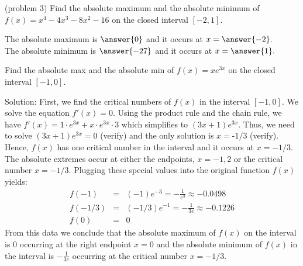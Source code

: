 \documentclass[handout]{ximera}
\begin{document}
\begin{problem}(problem 3)
Find the absolute maximum and the absolute minimum of $f(x) = x^4 - 4x^3 - 8x^2 - 16$  
on the closed interval $[-2, 1]$.

The absolute maximum is $\answer{0}$ and it occurs at $x = \answer{-2}.$
\\
The absolute minimum is $\answer{-27}$ and it occurs at $x = \answer{1}.$
\end{problem}



\begin{example}[example 4]
Find the absolute max and the absolute min of $f(x) = xe^{3x}$ on the closed interval $[-1, 0]$.

Solution:  First, we find the critical numbers of $f(x)$ in the 
interval $[-1, 0]$.   
We solve the equation $f'(x) =0$.  
Using the product rule and the chain rule, we have $f'(x) = 1\cdot e^{3x} + x\cdot e^{3x} \cdot 3$ which simplifies to $(3x+1)e^{3x}$. 
Thus, we need to solve $(3x+1)e^{3x} = 0$ (verify) and the only solution is $x=\text{-}1/3$ (verify).
Hence, $f(x)$ has one critical number in the interval and it occurs at $x = -1/3$.
The absolute extremes occur at either the endpoints, $x=-1, 2$ or the critical number $x = -1/3$.  
Plugging these special values into the original function $f(x)$ yields:
\begin{eqnarray*}
f(-1) &=& (-1)e^{-3} = -\frac{1}{e^3} \approx -0.0498\\
f(-1/3) &=& (-1/3)e^{-1} = -\frac{1}{3e} \approx -0.1226\\
f(0) &=& 0
\end{eqnarray*}
From this data we conclude that the absolute maximum of $f(x)$ on the interval is $0$ occurring 
at the right endpoint $x = 0$ and the absolute minimum of $f(x)$ in the interval is $-\frac{1}{3e}$
occurring at the critical number $x = -1/3$.
\begin{image}
\end{image}
\end{example}
\end{document}
